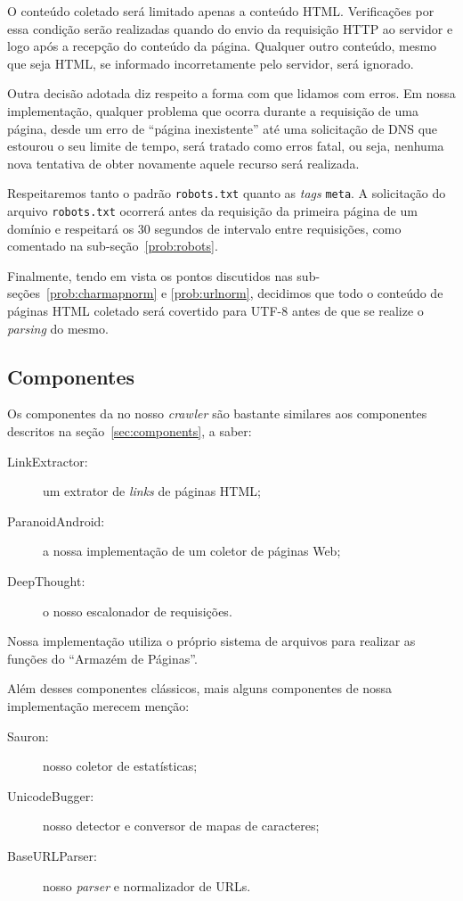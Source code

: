 \documentclass[10pt,twocolumn]{article}
\begin{document}
O conteúdo coletado será limitado apenas a conteúdo HTML. Verificações
por essa condição serão realizadas quando do envio da requisição HTTP ao
servidor e logo após a recepção do conteúdo da página. Qualquer outro
conteúdo, mesmo que seja HTML, se informado incorretamente pelo
servidor, será ignorado.

Outra decisão adotada diz respeito a forma com que lidamos com erros. Em
nossa implementação, qualquer problema que ocorra durante a requisição
de uma página, desde um erro de ``página inexistente'' até uma
solicitação de DNS que estourou o seu limite de tempo, será tratado
como erros fatal, ou seja, nenhuma nova tentativa de obter novamente
aquele recurso será realizada.

Respeitaremos tanto o padrão \texttt{robots.txt} quanto as
\emph{tags} \texttt{meta}. A solicitação do arquivo \texttt{robots.txt}
ocorrerá antes da requisição da primeira página de um domínio e
respeitará os 30 segundos de intervalo entre requisições, como comentado
na sub-seção~\ref{prob:robots}.

Finalmente, tendo em vista os pontos discutidos nas
sub-seções~\ref{prob:charmapnorm} e \ref{prob:urlnorm}, decidimos que
todo o conteúdo de páginas HTML coletado será covertido para UTF-8 antes
de que se realize o \emph{parsing} do mesmo.


\subsection{Componentes}

Os componentes da no nosso \emph{crawler} são bastante similares aos
componentes descritos na seção~\ref{sec:components}, a saber:
\begin{description}
\item[LinkExtractor:] um extrator de \emph{links} de páginas HTML;
\item[ParanoidAndroid:] a nossa implementação de um coletor de páginas
Web;
\item[DeepThought:] o nosso escalonador de requisições.
\end{description}

Nossa implementação utiliza o próprio sistema de arquivos para realizar
as funções do ``Armazém de Páginas''.

Além desses componentes clássicos, mais alguns componentes de nossa
implementação merecem menção:
\begin{description}
\item[Sauron:] nosso coletor de estatísticas;
\item[UnicodeBugger:] nosso detector e conversor de mapas de caracteres;
\item[BaseURLParser:] nosso \emph{parser} e normalizador de URLs.
\end{description}
\end{document}
